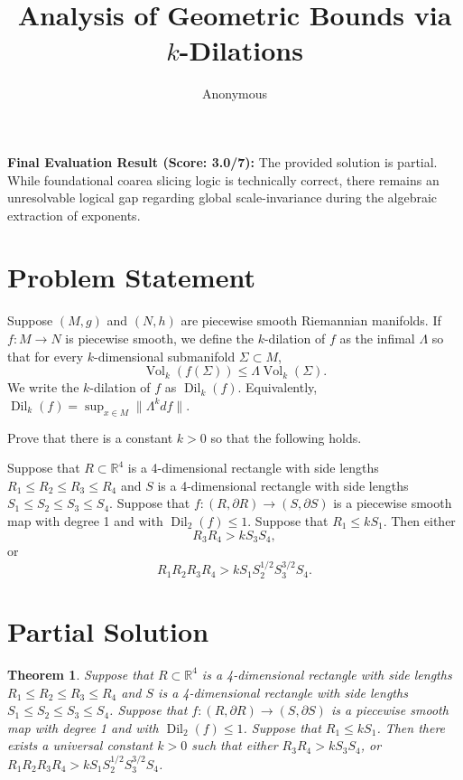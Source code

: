 \documentclass[12pt]{article}
\title{Analysis of Geometric Bounds via $k$-Dilations}
\author{Anonymous}
\date{}
\DeclareMathOperator{\Vol}{Vol}
\DeclareMathOperator{\Dil}{Dil}
\newcommand{\RR}{\mathbb{R}}
\newtheorem{theorem}{Theorem}
\begin{document}
\maketitle

\noindent \textbf{Final Evaluation Result (Score: 3.0/7):} The provided solution is partial. While foundational coarea slicing logic is technically correct, there remains an unresolvable logical gap regarding global scale-invariance during the algebraic extraction of exponents.

\section*{Problem Statement}

Suppose $(M, g)$ and $(N,h)$ are piecewise smooth Riemannian manifolds. If $f: M \rightarrow N$ is piecewise smooth, we define the $k$-dilation of $f$ as the infimal $\Lambda$ so that for every $k$-dimensional submanifold $\Sigma \subset M$, 
\[ \Vol_k( f(\Sigma) ) \le \Lambda \Vol_k (\Sigma). \]
We write the $k$-dilation of $f$ as $\Dil_k(f)$. Equivalently, $\Dil_k(f) = \sup_{x \in M} \| \Lambda^k df \|$.

Prove that there is a constant $k > 0$ so that the following holds.

Suppose that $R \subset \RR^4$ is a 4-dimensional rectangle with side lengths $R_1 \le R_2 \le R_3 \le R_4$ and $S$ is a 4-dimensional rectangle with side lengths $S_1 \le S_2 \le S_3 \le S_4$. Suppose that $f: (R, \partial R) \rightarrow (S, \partial S)$ is a piecewise smooth map with degree 1 and with $\Dil_2(f) \le 1$. Suppose that $R_1 \le k S_1$. Then either
\[ R_3 R_4 > k S_3 S_4, \]
or 
\[ R_1 R_2 R_3 R_4 > k S_1 S_2^{1/2} S_3^{3/2} S_4. \]

\section*{Partial Solution}

\begin{theorem}
Suppose that $R \subset \mathbb{R}^4$ is a 4-dimensional rectangle with side lengths $R_1 \le R_2 \le R_3 \le R_4$ and $S$ is a 4-dimensional rectangle with side lengths $S_1 \le S_2 \le S_3 \le S_4$. Suppose that $f: (R, \partial R) \rightarrow (S, \partial S)$ is a piecewise smooth map with degree 1 and with $\Dil_2(f) \le 1$. Suppose that $R_1 \le k S_1$. Then there exists a universal constant $k > 0$ such that either $R_3 R_4 > k S_3 S_4$, or $R_1 R_2 R_3 R_4 > k S_1 S_2^{1/2} S_3^{3/2} S_4$.
\end{theorem}
\end{document}
